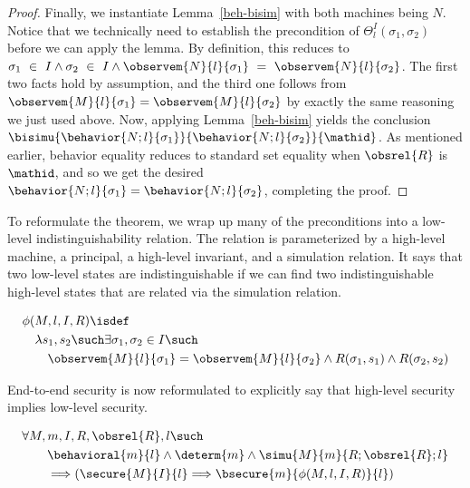 \begin{proof}
Finally, we instantiate Lemma~\ref{beh-bisim} with both machines
being $N$. Notice that we technically need to establish the
precondition of $\Theta^{I}_l(\sigma_1,\sigma_2)$ before we can 
apply the lemma. By definition, this reduces to 
$\sigma_1~\in~I \land \sigma_2~\in~I \land 
\observem{N}{l}{\sigma_1}~=~\observem{N}{l}{\sigma_2}$.
The first two facts hold by assumption, and the third one
follows from $\observem{M}{l}{\sigma_1} = \observem{M}{l}{\sigma_2}$ 
by exactly the same reasoning we just used above.
Now, applying Lemma~\ref{beh-bisim} yields the conclusion
$\bisimu{\behavior{N;l}{\sigma_1}}{\behavior{N;l}{\sigma_2}}{\mathid}$.
As mentioned earlier, behavior equality reduces to standard set
equality when $\obsrel{R}$ is $\mathid$, and so we get the desired
$\behavior{N;l}{\sigma_1} = \behavior{N;l}{\sigma_2}$, completing
the proof.
\end{proof}

To reformulate the theorem, we wrap up many of the preconditions
into a low-level indistinguishability relation. The relation
is parameterized by a high-level machine, a principal, a high-level
invariant, and a simulation relation. It says that two low-level
states are indistinguishable if we can find two indistinguishable
high-level states that are related via the simulation relation.

\begin{definition}
{\small
\begin{align*}
& \phi(M,l,I,R) \isdef \\
& \quad \lambda s_1, s_2 \such \exists \sigma_1, \sigma_2 \in I \such \\
& \quad \quad \observem{M}{l}{\sigma_1} = \observem{M}{l}{\sigma_2} 
\land R(\sigma_1,s_1) \land R(\sigma_2,s_2)
\end{align*}}
\end{definition}

\noindent
End-to-end security is now reformulated to explicitly say that
high-level security implies low-level security.

\begin{cor}
{\small
\begin{align*}
& \forall M, m, I, R, 
\obsrel{R},
l \such \\
& \qquad \behavioral{m}{l} \land \determ{m} \land 
\simu{M}{m}{R;\obsrel{R};l} \\
& \qquad \Longrightarrow 
\left(\secure{M}{I}{l} \Longrightarrow \bsecure{m}{\phi(M,l,I,R)}{l}\right)
\end{align*}}
\end{cor}





